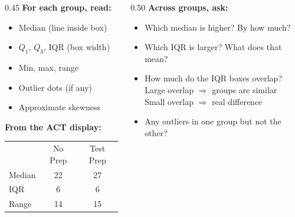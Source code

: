 \documentclass[aspectratio=169, 11pt]{beamer}
\begin{document}
{
\begin{frame}[t, plain]
  \vspace{0.45cm}\par
  \hspace{0.55cm}%
  \begin{minipage}{0.9\textwidth}
    \small
    \begin{columns}[T]
    \begin{column}{0.45\textwidth}
      \textbf{For each group, read:}
      \begin{itemize}\setlength{\itemsep}{0.35em}
        \item Median (line inside box)
        \item $Q_1$, $Q_3$, IQR (box width)
        \item Min, max, range
        \item Outlier dots (if any)
        \item Approximate skewness
      \end{itemize}

      \vspace{0.5em}
      \textbf{From the ACT display:}\\[0.3em]
      \begin{tabular}{lcc}
        & No Prep & Test Prep \\
        Median & 22 & 27 \\
        IQR    & 6  & 6  \\
        Range  & 14 & 15 \\
      \end{tabular}
    \end{column}
    \begin{column}{0.50\textwidth}
      \textbf{Across groups, ask:}
      \begin{itemize}\setlength{\itemsep}{0.4em}
        \item Which median is higher? By how much?
        \item Which IQR is larger? What does that mean?
        \item How much do the IQR boxes overlap?\\
              Large overlap $\Rightarrow$ groups are similar\\
              Small overlap $\Rightarrow$ real difference
        \item Any outliers in one group but not the other?
      \end{itemize}


\end{column}
\end{columns}
\end{minipage}
\end{frame}}
\end{document}
